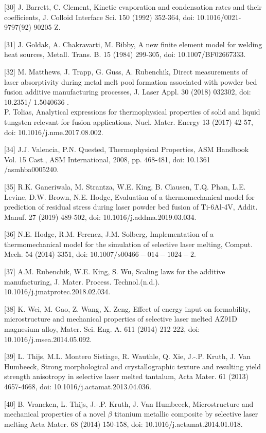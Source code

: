 \documentclass[10pt]{article}
\begin{document}
[30] J. Barrett, C. Clement, Kinetic evaporation and condensation rates and their coefficients, J. Colloid Interface Sci. 150 (1992) 352-364, doi: 10.1016/0021-9797(92) 90205-Z.

[31] J. Goldak, A. Chakravarti, M. Bibby, A new finite element model for welding heat sources, Metall. Trans. B. 15 (1984) 299-305, doi: 10.1007/BF02667333.

[32] M. Matthews, J. Trapp, G. Guss, A. Rubenchik, Direct measurements of laser absorptivity during metal melt pool formation associated with powder bed fusion additive manufacturing processes, J. Laser Appl. 30 (2018) 032302, doi: 10.2351/ 1.5040636 .\\
[33] P. Tolias, Analytical expressions for thermophysical properties of solid and liquid tungsten relevant for fusion applications, Nucl. Mater. Energy 13 (2017) 42-57, doi: 10.1016/j.nme.2017.08.002.

[34] J.J. Valencia, P.N. Quested, Thermophysical Properties, ASM Handbook Vol. 15 Cast., ASM International, 2008, pp. 468-481, doi: 10.1361 /asmhba0005240.

[35] R.K. Ganeriwala, M. Strantza, W.E. King, B. Clausen, T.Q. Phan, L.E. Levine, D.W. Brown, N.E. Hodge, Evaluation of a thermomechanical model for prediction of residual stress during laser powder bed fusion of Ti-6Al-4V, Addit. Manuf. 27 (2019) 489-502, doi: 10.1016/j.addma.2019.03.034.

[36] N.E. Hodge, R.M. Ferencz, J.M. Solberg, Implementation of a thermomechanical model for the simulation of selective laser melting, Comput. Mech. 54 (2014) 3351, doi: $10.1007 / s 00466-014-1024-2$.

[37] A.M. Rubenchik, W.E. King, S. Wu, Scaling laws for the additive manufacturing, J. Mater. Process. Technol.(n.d.). 10.1016/j.jmatprotec.2018.02.034.

[38] K. Wei, M. Gao, Z. Wang, X. Zeng, Effect of energy input on formability, microstructure and mechanical properties of selective laser melted AZ91D magnesium alloy, Mater. Sci. Eng. A. 611 (2014) 212-222, doi: 10.1016/j.msea.2014.05.092.

[39] L. Thijs, M.L. Montero Sistiage, R. Wauthle, Q. Xie, J.-.P. Kruth, J. Van Humbeeck, Strong morphological and crystallographic texture and resulting yield strength anisotropy in selective laser melted tantalum, Acta Mater. 61 (2013) 4657-4668, doi: 10.1016/j.actamat.2013.04.036.

[40] B. Vrancken, L. Thijs, J.-.P. Kruth, J. Van Humbeeck, Microstructure and mechanical properties of a novel $\beta$ titanium metallic composite by selective laser melting Acta Mater. 68 (2014) 150-158, doi: 10.1016/j.actamat.2014.01.018.
\end{document}
